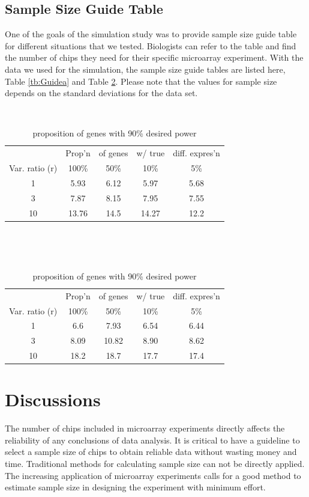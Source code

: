\documentclass{bioinfo}
\begin{document}
\subsection{Sample Size Guide Table}

One of the goals of the simulation study was to provide sample
size guide table for different situations that we tested.
Biologists can refer to the table and find the number of chips
they need for their specific microarray experiment. With the data
we used for the simulation, the sample size guide tables are
listed here, Table \ref{tb:Guidea} and Table \ref{tb:Guideb}.
Please note that the values for sample size depends on the
standard deviations for the data set.

\begin{table}\centering
  \caption{proposition of genes with 80\% desired power}\
  \begin{tabular}{ccccc} \hline
    &Prop'n&of genes& w/ true & diff. expres'n\\
    Var. ratio (r) & 100\% & 50\% & 10\% & 5\%\\
    \hline
    1 & 5.93 & 6.12 & 5.97 & 5.68\\
    3 & 7.87 & 8.15 & 7.95 & 7.55\\
    10 & 13.76 & 14.5 & 14.27 & 12.2\\
    \hline
  \end{tabular}
  \label{tb:Guidea}
  \\
  \caption{proposition of genes with 90\% desired power}\
  \begin{tabular}{ccccc} \hline
    &Prop'n&of genes& w/ true & diff. expres'n\\
    Var. ratio (r) & 100\% & 50\% & 10\% & 5\%\\
    \hline
    1 & 6.6 & 7.93 & 6.54 & 6.44\\
    3 & 8.09 & 10.82 & 8.90 & 8.62\\
    10 & 18.2 & 18.7 & 17.7 & 17.4\\
    \hline
  \end{tabular}
  \label{tb:Guideb}
\end{table}




\section{Discussions}

The number of chips included in microarray experiments directly
affects the reliability of any conclusions of data analysis. It is
critical to have a guideline to select a sample size of chips to
obtain reliable data without wasting money and time. Traditional
methods for calculating sample size can not be directly applied.
The increasing application of microarray experiments calls for a
good method to estimate sample size in designing the experiment
with minimum effort.
\end{document}
